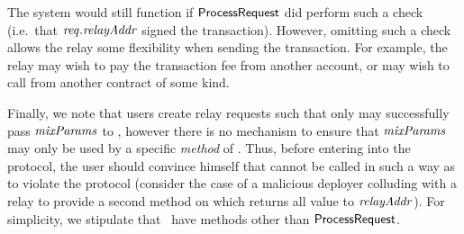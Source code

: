 The system would still function if $\mathsf{ProcessRequest}$ did perform such a check (i.e.~that $\mathit{req}.\mathit{relayAddr}$ signed the transaction). However, omitting such a check allows the relay some flexibility when sending the transaction. For example, the relay may wish to pay the transaction fee from another account, or may wish to call \relayexec{} from another contract of some kind.

Finally, we note that users create relay requests such that only \relayexec{} may successfully pass $\mathit{mixParams}$ to \mixer{}, however there is no mechanism to ensure that $\mathit{mixParams}$ may only be used by a specific \emph{method} of \relayexec{}. Thus, before entering into the protocol, the user should convince himself that \relayexec{} cannot be called in such a way as to violate the protocol (consider the case of a malicious deployer colluding with a relay to provide a second method on \relayexec{} which returns all value to $\mathit{relayAddr}$). For simplicity, we stipulate that \relayexec{} \MUSTNOT~have methods other than $\mathsf{ProcessRequest}$.
